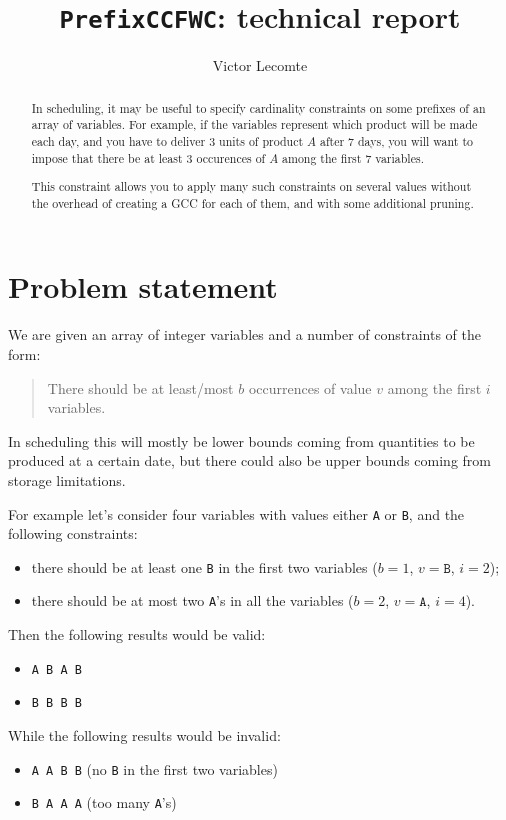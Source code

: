 \documentclass[a4paper,10pt]{article}
\begin{document}
\title{\texttt{PrefixCCFWC}: technical report}
\author{Victor Lecomte}
\maketitle

\begin{abstract}
In scheduling, it may be useful to specify cardinality constraints on some prefixes of an array of variables. For example, if the variables represent which product will be made each day, and you have to deliver 3 units of product $A$ after 7 days, you will want to impose that there be at least 3 occurences of $A$ among the first 7 variables.

This constraint allows you to apply many such constraints on several values without the overhead of creating a GCC for each of them, and with some additional pruning.
\end{abstract}

\tableofcontents

\section{Problem statement}
We are given an array of integer variables and a number of constraints of the form:
\begin{quote}
There should be at least/most $b$ occurrences of value $v$ among the first $i$ variables.
\end{quote}
In scheduling this will mostly be lower bounds coming from quantities to be produced at a certain date, but there could also be upper bounds coming from storage limitations.

For example let's consider four variables with values either \texttt{A} or \texttt{B}, and the following constraints:
\begin{itemize}
    \item there should be at least one \texttt{B} in the first two variables ($b=1$, $v=\texttt{B}$, $i=2$);
    \item there should be at most two \texttt{A}'s in all the variables ($b=2$, $v=\texttt{A}$, $i=4$).
\end{itemize}
Then the following results would be valid:
\begin{itemize}
    \item \texttt{A B A B}
    \item \texttt{B B B B}
\end{itemize}
While the following results would be invalid:
\begin{itemize}
    \item \texttt{A A B B} (no \texttt{B} in the first two variables)
    \item \texttt{B A A A} (too many \texttt{A}'s)
\end{itemize}
\end{document}
